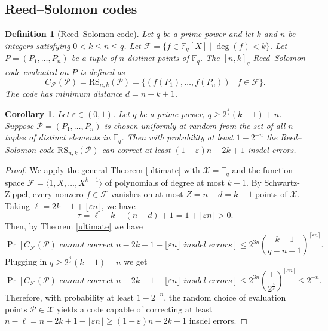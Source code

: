 \documentclass[draft, onecolumn, 11pt]{IEEEtran}
\newtheorem{definition}[theorem]{Definition}
\newtheorem{corollary}[theorem]{Corollary}
\newcommand{\F}{\mathbb{F}}
\begin{document}
\subsection{Reed--Solomon codes}
\begin{definition}[Reed--Solomon code]
    Let $q$ be a prime power and let $k$ and $n$ be integers satisfying $0 < k \leq n \leq q$. Let $\mathcal{F} = \lbrace f \in \F_q[X] \mid \deg(f) < k\rbrace$. Let $P = (P_1, \dots, P_{n})$ be a tuple of $n$ distinct points of $\F_q$. The $[n,k]_q$ Reed--Solomon code evaluated on $P$ is defined as
    $$C_{\mathcal{F}}(\mathcal{P}) = \mathrm{RS}_{n,k}(\mathcal{P}) = \lbrace \left(f(P_1),\dots,f(P_{n})\right) \mid f \in \mathcal{F} \rbrace.$$ 
    The code has minimum distance $d = n-k+1$.
\end{definition}

\begin{corollary} \label{RS}
    Let $\varepsilon \in (0,1)$. Let $q$ be a prime power, $q \geq 2^{\frac{4}{\varepsilon}}(k-1) + n$. Suppose $\mathcal{P} = (P_1, \dots, P_n)$ is chosen uniformly at random from the set of all $n$-tuples of distinct elements in $\F_q$. Then with probability at least $1- 2^{-n}$ the Reed--Solomon code $\mathrm{RS}_{n,k}({\mathcal{P}})$ can correct at least $(1 - \varepsilon)n - 2k + 1$ insdel errors.
\end{corollary}
\begin{proof}
    We apply the general Theorem \ref{ultimate} with $\mathcal{X} = \F_q$ and the function space $\mathcal{F} = \langle 1, X , \dots, X^{k-1}\rangle$ of polynomials of degree at most $k-1$. By Schwartz-Zippel, every nonzero $f \in \mathcal{F}$ vanishes on at most $Z = n-d = k-1$ points of $\mathcal{X}$.
    Taking $\ell = 2k - 1 + \lfloor \varepsilon n \rfloor$, we have 
    $$\tau = \ell - k - (n-d) + 1 = 1 + \lfloor\varepsilon n \rfloor > 0.$$
    Then, by Theorem \ref{ultimate} we have 
    $$\Pr[C_{\mathcal{F}}(\mathcal{P}) \textit{ cannot correct $n-2k + 1 - \lfloor \varepsilon n \rfloor$ insdel errors}] \leq 2^{3n}\left(\frac{k-1}{q - n + 1}\right)^{\lceil \varepsilon n \rceil}.$$
    Plugging in $q \geq 2^{\frac{4}{\varepsilon}}(k-1) + n$ we get 
    $$\Pr[C_{\mathcal{F}}(\mathcal{P}) \textit{ cannot correct $n-2k + 1 - \lfloor \varepsilon n \rfloor$ insdel errors}] \leq 2^{3n}\left(\frac{1}{2^{\frac{4}{\varepsilon}}}\right)^{\lceil \varepsilon n \rceil} \leq 2^{-n}.$$
    Therefore, with probability at least $1-2^{-n}$, the random choice of evaluation points $\mathcal{P} \in \mathcal{X}$ yields a code capable of correcting at least $n-\ell = n-2k+1-\lfloor\varepsilon n\rfloor \geq (1 - \varepsilon)n - 2k + 1$ insdel errors.
\end{proof}
\end{document}
